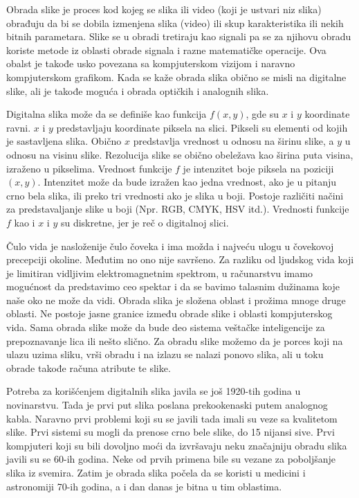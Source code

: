 \documentclass[a4paper,12pt,titlepage]{article}
\begin{document}
Obrada slike je proces kod kojeg se slika ili video (koji je ustvari niz slika) obrađuju da bi se dobila izmenjena slika (video) ili skup karakteristika
ili nekih bitnih parametara. Slike se u obradi tretiraju kao signali pa se za njihovu obradu koriste metode iz oblasti obrade signala i razne matematičke operacije. Ova obalst je takođe usko povezana sa kompjuterskom vizijom i naravno kompjuterskom grafikom. Kada se kaže obrada slika obično se misli na digitalne slike, ali je takođe moguća i obrada optičkih i analognih slika. 

Digitalna slika može da se definiše kao funkcija $f(x, y)$, gde su $x$ i $y$ koordinate ravni. $x$ i $y$ predstavljaju koordinate piksela na slici. Pikseli su elementi od kojih je sastavljena slika. Obično $x$ predstavlja vrednost u odnosu na širinu slike, a $y$ u odnosu na visinu slike. Rezolucija slike se obično obeležava kao širina puta visina, izraženo u pikselima. Vrednost funkcije $f$ je intenzitet boje piksela na poziciji $(x, y)$. Intenzitet može da bude izražen kao jedna vrednost, ako je u pitanju crno bela slika, ili preko tri vrednosti ako je slika u boji. Postoje različiti načini za predstavaljanje slike u boji (Npr. RGB, CMYK, HSV itd.). Vrednosti funkcije $f$ kao i $x$ i $y$ su diskretne, jer je reč o digitalnoj slici. 

Čulo vida je nasloženije čulo čoveka i ima možda i najveću ulogu u čovekovoj precepciji okoline. Međutim no ono nije savršeno. Za razliku od ljudskog vida koji je limitiran vidljivim elektromagnetnim spektrom, u računarstvu imamo mogućnost da predstavimo ceo spektar i da se bavimo talasnim dužinama koje naše oko ne može da vidi. Obrada slika je složena oblast i prožima mnoge druge oblasti. Ne postoje jasne granice između obrade slike i oblasti kompjuterskog vida. Sama obrada slike može da bude deo sistema veštačke inteligencije za prepoznavanje lica ili nešto slično. Za obradu slike možemo da je porces koji na ulazu uzima sliku,   
vrši obradu i na izlazu se nalazi ponovo slika, ali u toku obrade takođe računa atribute te slike. 

Potreba za korišćenjem digitalnih slika javila se još 1920-tih godina u novinarstvu. Tada je prvi put slika poslana prekookenaski putem analognog kabla. Naravno prvi problemi koji su se javili tada imali su veze sa kvalitetom slike. Prvi sistemi su mogli da prenose crno bele slike, do 15 nijansi sive. Prvi kompjuteri koji su bili dovoljno moći da izvršavaju neku značajniju obradu slika javili su se 60-ih godina. Neke od prvih primena bile su vezane za poboljšanje slika iz svemira. Zatim je obrada slika počela da se koristi u medicini i astronomiji 70-ih godina, a i dan danas je bitna u tim oblastima.
\end{document}
